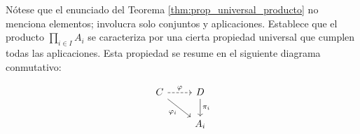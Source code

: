 Nótese que el enunciado del Teorema \ref{thm:prop_universal_producto} no menciona elementos; involucra solo conjuntos y aplicaciones. Establece que el producto $\prod_{i \in I} A_i$ se caracteriza por una cierta propiedad universal que cumplen todas las aplicaciones. Esta propiedad se resume en el siguiente diagrama conmutativo:

\[
    \begin{tikzcd}
    C \arrow[swap]{dr}{\varphi_i} \arrow[dashed]{r}{\varphi} & D \arrow{d}{\pi_i} \\
    & A_i
    \end{tikzcd}
\]